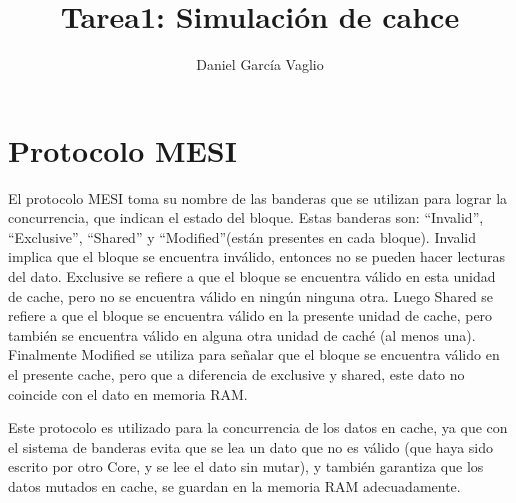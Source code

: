 \documentclass {article}
\begin{document}
\lstset{language=,breaklines=true, basicstyle=\tiny}
\lstset{stepnumber=0}

\title{Tarea1: Simulación de cahce}
\author{Daniel García Vaglio}
\maketitle



\section{Protocolo MESI}
El protocolo MESI toma su nombre de las banderas que se utilizan para lograr la concurrencia, que
indican el estado del bloque. Estas banderas son: ``Invalid'', ``Exclusive'', ``Shared'' y
``Modified''(están presentes en cada bloque). Invalid implica que el bloque se encuentra inválido, entonces no se pueden hacer
lecturas del dato. Exclusive se refiere a que el bloque se encuentra válido en esta unidad de cache,
pero no se encuentra válido en ningún ninguna otra. Luego Shared se refiere a que el bloque se
encuentra válido en la presente unidad de cache, pero también se encuentra válido en alguna otra
unidad de caché (al menos una). Finalmente Modified se utiliza para señalar que el bloque se
encuentra válido en el presente cache, pero que a diferencia de exclusive y shared, este dato no
coincide con el dato en memoria RAM.

Este protocolo es utilizado para la concurrencia de los datos en cache, ya que con el sistema de
banderas evita que se lea un dato que no es válido (que haya sido escrito por otro Core, y se lee el
dato sin mutar), y también garantiza que los datos mutados en cache, se guardan en la memoria RAM
adecuadamente.
\end{document}

